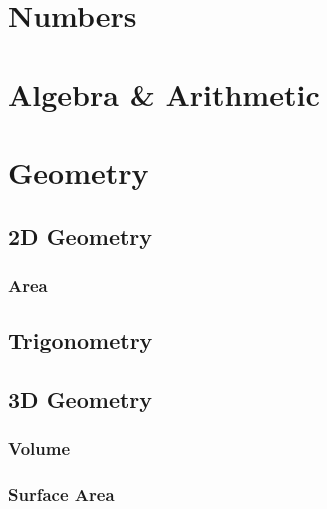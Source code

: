 

\chapter{Numbers}

\chapter{Algebra \& Arithmetic}
\chapter{Geometry}
\section{2D Geometry}
\subsection{Area}
\section{Trigonometry}
\section{3D Geometry}
\subsection{Volume}
\subsection{Surface Area}

